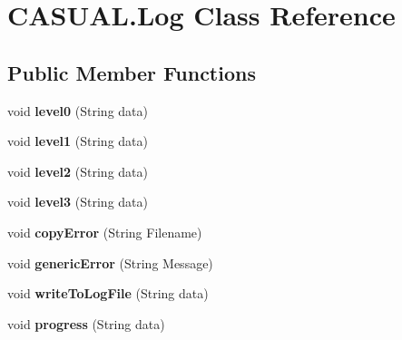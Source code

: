 \hypertarget{classCASUAL_1_1Log}{\section{C\-A\-S\-U\-A\-L.\-Log Class Reference}
\label{classCASUAL_1_1Log}
}
\subsection*{Public Member Functions}
\begin{DoxyCompactItemize}
\item 
\hypertarget{classCASUAL_1_1Log_af6e3bfc98540f4b2b4a7b8f0972ff46b}{void {\bfseries level0} (String data)}\label{classCASUAL_1_1Log_af6e3bfc98540f4b2b4a7b8f0972ff46b}

\item 
\hypertarget{classCASUAL_1_1Log_ae15ba5a18f0da5ffb5ec23cbc9e27bb7}{void {\bfseries level1} (String data)}\label{classCASUAL_1_1Log_ae15ba5a18f0da5ffb5ec23cbc9e27bb7}

\item 
\hypertarget{classCASUAL_1_1Log_ae587e45a337671bec97c3dd12296e6d6}{void {\bfseries level2} (String data)}\label{classCASUAL_1_1Log_ae587e45a337671bec97c3dd12296e6d6}

\item 
\hypertarget{classCASUAL_1_1Log_a24fad4a3a0a91ef33054eb9c04133963}{void {\bfseries level3} (String data)}\label{classCASUAL_1_1Log_a24fad4a3a0a91ef33054eb9c04133963}

\item 
\hypertarget{classCASUAL_1_1Log_aa20b5a7ed3c68f65559b127a2c14231f}{void {\bfseries copy\-Error} (String Filename)}\label{classCASUAL_1_1Log_aa20b5a7ed3c68f65559b127a2c14231f}

\item 
\hypertarget{classCASUAL_1_1Log_ad87445d4bff7a19de8b254e795ee5dc2}{void {\bfseries generic\-Error} (String Message)}\label{classCASUAL_1_1Log_ad87445d4bff7a19de8b254e795ee5dc2}

\item 
\hypertarget{classCASUAL_1_1Log_acd0cd0a6ea0d89511fd97317715daa72}{void {\bfseries write\-To\-Log\-File} (String data)}\label{classCASUAL_1_1Log_acd0cd0a6ea0d89511fd97317715daa72}

\item 
\hypertarget{classCASUAL_1_1Log_ac7992ba5f3159c62058e5477c2ad4f5c}{void {\bfseries progress} (String data)}\label{classCASUAL_1_1Log_ac7992ba5f3159c62058e5477c2ad4f5c}


\end{DoxyCompactItemize}
